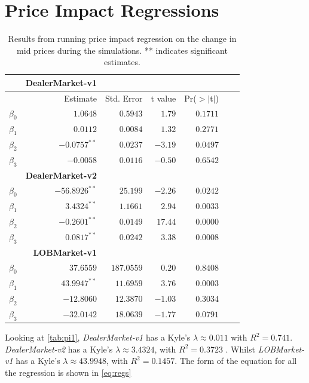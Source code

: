 \documentclass{kththesis}
\theoremstyle{definition}
\begin{document}
\section{Price Impact Regressions}
\begin{table}[H]
\centering
\caption{Results from running price impact regression on the change in mid prices during the simulations. ** indicates significant estimates.}
\label{tab:pi1}
\begin{tabular}{rrrrrrr}
  \hline
  & \textbf{DealerMarket-v1} \\
  \hline
 & Estimate & Std. Error & t value & Pr($>$$|$t$|$) \\ 
 
  \hline
$\beta_0$ & $1.0648$ & $0.5943$ & $1.79$ & $0.1711$  \\ 
  $\beta_1$ & $0.0112$ & $0.0084$ & $1.32$ & $0.2771$  \\ 
  $\beta_2$ & $-0.0757^{**}$ & $0.0237$ & $-3.19$ & $0.0497$  \\ 
  $\beta_3$ & $-0.0058$ & $0.0116$ & $-0.50$ & $0.6542$  \\ 
  
  \hline
  & \textbf{DealerMarket-v2} \\
  \hline
  $\beta_0$ & $-56.8926^{**}$ & $25.199$ & $-2.26$ & $0.0242$ \\ 
  $\beta_1$ & $3.4324^{**}$ & $1.1661$ & $2.94$ & $0.0033$  \\ 
  $\beta_2$ & $-0.2601^{**}$ & $0.0149$ & $17.44$ & $0.0000$ \\ 
  $\beta_3$ & $0.0817^{**}$ & $0.0242$ & $3.38$ & $0.0008$ \\ 
  
  \hline
  & \textbf{LOBMarket-v1} \\
  \hline
  $\beta_0$ & $37.6559$ & $187.0559$ & $0.20$ & $0.8408$ \\ 
  $\beta_1$ & $43.9947^{**}$ & $11.6959$ & $3.76$ & $0.0003$ \\ 
  $\beta_2$ & $-12.8060$ & $12.3870$ & $-1.03$ & $0.3034$ \\ 
  $\beta_3$ & $-32.0142$ & $18.0639$ & $-1.77$ & $0.0791$ \\
   \hline
\end{tabular}
\end{table}
Looking at \autoref{tab:pi1}, \textit{DealerMarket-v1} has a Kyle's $\lambda \approx 0.011$ with $R^{2}=0.741$. \textit{DealerMarket-v2} has a Kyle's $\lambda \approx 3.4324$, with $R^{2}= 0.3723$ . Whilst \textit{LOBMarket-v1} has a Kyle's $\lambda \approx 43.9948$, with $R^{2}= 0.1457 $. The form of the equation for all the regression is shown in \autoref{eq:regs}
\end{document}
